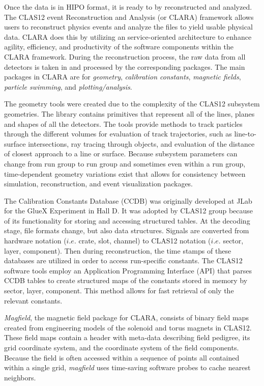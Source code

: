 Once the data is in HIPO format, it is ready to by reconstructed and analyzed. The CLAS12 event Reconstruction and Analysis (or CLARA) framework allows users to reconstruct physics events and analyze the files to yield usable physical data. CLARA does this by utilizing an service-oriented architecture to enhance agility, efficiency, and productivity of the software components within the CLARA framework. During the reconstruction process, the raw data from all detectors is taken in and processed by the corresponding packages. The main packages in CLARA are for \textit{geometry}, \textit{calibration constants}, \textit{magnetic fields}, \textit{particle swimming}, and \textit{plotting/analysis}.

The geometry tools were created due to the complexity of the CLAS12 subsystem geometries. The library contains primitives that represent all of the lines, planes and shapes of all the detectors. The tools provide methods to track particles through the different volumes for evaluation of track trajectories, such as line-to-surface intersections, ray tracing through objects, and evaluation of the distance of closest approach to a line or surface.  Because subsystem parameters can change from run group to run group and sometimes even within a run group, time-dependent geometry variations exist that allows for consistency between simulation, reconstruction, and event visualization packages.

The Calibration Constants Database (CCDB) was originally developed at JLab for the GlueX Experiment in Hall D. It was adopted by CLAS12 group because of its functionality for storing and accessing structured tables. At the decoding stage, file formats change, but also data structures. Signals are converted from hardware notation ($i.e.$ crate, slot, channel) to CLAS12 notation ($i.e.$ sector, layer, component). Then during reconstruction, the time stamps of these databases are utilized in order to access run-specific constants. The CLAS12 software tools employ an Application Programming Interface (API) that parses CCDB tables to create structured maps of the constants stored in memory by sector, layer, component. This method allows for fast retrieval of only the relevant constants.

\textit{Magfield}, the magnetic field package for CLARA, consists of binary field maps created from engineering models of the solenoid and torus magnets in CLAS12. These field maps contain a header with meta-data describing field pedigree, its grid coordinate system, and the coordinate system of the field components. Because the field is often accessed within a sequence of points all contained within a single grid, \textit{magfield} uses time-saving software probes to cache nearest neighbors.

